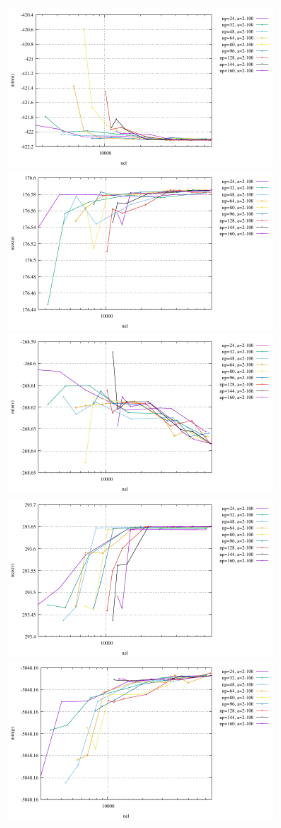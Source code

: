 \begin{center}
\includegraphics[width=7cm]{python_codes/fieldstone_93/results_exp4/min_u}
\includegraphics[width=7cm]{python_codes/fieldstone_93/results_exp4/max_u}\\
\includegraphics[width=7cm]{python_codes/fieldstone_93/results_exp4/min_v}
\includegraphics[width=7cm]{python_codes/fieldstone_93/results_exp4/max_v}\\
\includegraphics[width=7cm]{python_codes/fieldstone_93/results_exp4/min_p}

\end{center}
